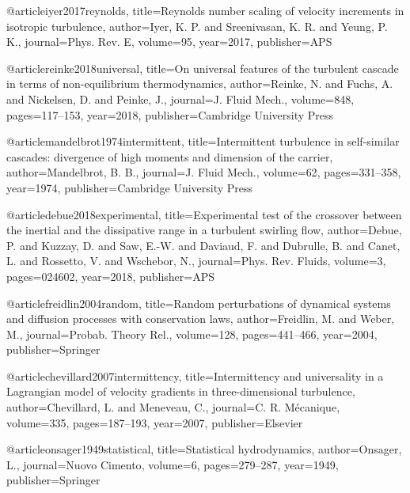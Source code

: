  @article{iyer2017reynolds,
    title={{Reynolds number scaling of velocity increments in isotropic turbulence}},
    author={Iyer, K. P. and Sreenivasan, K. R. and Yeung, P. K.},
    journal={Phys. Rev. E},
    volume={95},
    year={2017},
    publisher={APS}
  }


  @article{reinke2018universal,
    title={{On universal features of the turbulent cascade in terms of non-equilibrium thermodynamics}},
    author={Reinke, N. and Fuchs, A. and Nickelsen, D. and Peinke, J.},
    journal={J. Fluid Mech.},
    volume={848},
    pages={117--153},
    year={2018},
    publisher={Cambridge University Press}
  }

  @article{mandelbrot1974intermittent,
    title={{Intermittent turbulence in self-similar cascades: divergence of high moments and dimension of the carrier}},
    author={Mandelbrot, B. B.},
    journal={J. Fluid Mech.},
    volume={62},
    pages={331--358},
    year={1974},
    publisher={Cambridge University Press}
  }

  @article{debue2018experimental,
    title={{Experimental test of the crossover between the inertial and the dissipative range in a turbulent swirling flow}},
    author={Debue, P. and Kuzzay, D. and Saw, E.-W. and Daviaud, F. and Dubrulle, B. and Canet, L. and Rossetto, V. and Wschebor, N.},
    journal={Phys. Rev. Fluids},
    volume={3},
    pages={024602},
    year={2018},
    publisher={APS}
  }


  @article{freidlin2004random,
    title={{Random perturbations of dynamical systems and diffusion processes with conservation laws}},
    author={Freidlin, M. and Weber, M.},
    journal={Probab. Theory Rel.},
    volume={128},
    pages={441--466},
    year={2004},
    publisher={Springer}
  }


  @article{chevillard2007intermittency,
    title={{Intermittency and universality in a Lagrangian model of velocity gradients in three-dimensional turbulence}},
    author={Chevillard, L. and Meneveau, C.},
    journal={C. R. M{\'e}canique},
    volume={335},
    pages={187--193},
    year={2007},
    publisher={Elsevier}
  }


  @article{onsager1949statistical,
    title={{Statistical hydrodynamics}},
    author={Onsager, L.},
    journal={Nuovo Cimento},
    volume={6},
    pages={279--287},
    year={1949},
    publisher={Springer}
  }

